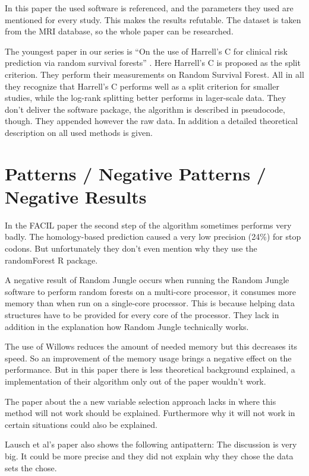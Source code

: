 \documentclass{sig-alternate-05-2015}
\begin{document}
In this paper the used software is referenced, and the parameters they used are mentioned for every study. This makes the results refutable. The dataset is taken from the MRI database, so the whole paper can be researched.

The youngest paper in our series is ``On the use of Harrell's C for clinical risk prediction via random survival forests'' \cite{Schmid2016450}. Here Harrell's C is proposed as the split criterion. They perform their measurements on Random Survival Forest.
All in all they recognize that  Harrell's C performs well as a split criterion for smaller studies, while the log-rank splitting better performs in lager-scale data. 
They don't deliver the software package, the algorithm is described in pseudocode, though. They appended however the raw data. In addition a detailed theoretical description on all used methods is given. 

\section{Patterns / Negative Patterns / Negative Results}
In the FACIL paper the second step of the algorithm sometimes performs very badly. The homology-based prediction caused a very low precision (24\%) for stop codons. But unfortunately they don't even mention why they use the randomForest R package.

A negative result of Random Jungle occurs when running the Random Jungle software to perform random forests on a multi-core processor, it consumes more memory than when run on a single-core processor. This is because helping data structures have to be provided for every core of the processor. They lack in addition in the explanation how Random Jungle technically works.

The use of Willows reduces the amount of needed memory but this decreases its speed. So an improvement of the memory usage  brings a negative effect on the performance. But in this paper there is less theoretical background explained, a implementation of their algorithm only out of the paper wouldn't work.

The paper about the a new variable selection approach lacks in where this method will not work should be explained. Furthermore why it will not work in certain situations could also be explained. 

Lausch et al's paper also shows the following antipattern: The discussion is very big. It could be more precise and they did not explain why they chose the data sets the chose. 
\end{document}
